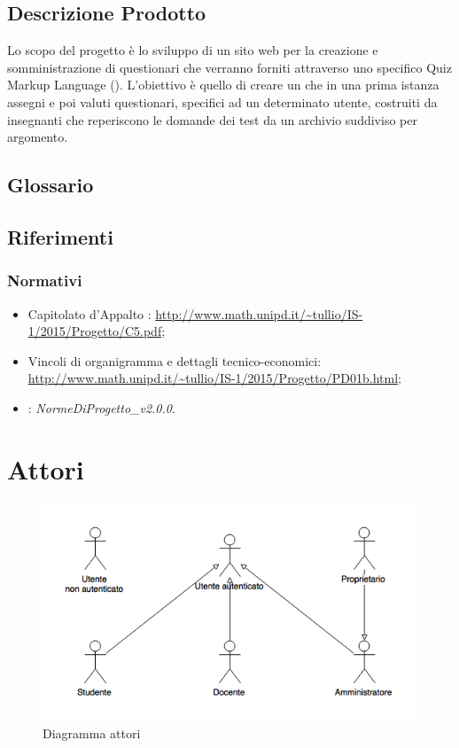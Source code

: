 \documentclass[12pt,a4paper]{article}
\begin{document}
\subsection{Descrizione Prodotto}
Lo scopo del progetto è lo sviluppo di un sito web per la creazione e somministrazione di questionari che verranno forniti attraverso uno specifico Quiz Markup Language (). L'obiettivo è quello di creare un  che in una prima istanza assegni e poi valuti questionari, specifici ad un determinato utente, costruiti da insegnanti che reperiscono le domande dei test da un archivio suddiviso per argomento.

\subsection{Glossario}
\glossarioPrint

\subsection{Riferimenti}
\subsubsection{Normativi}
\begin{itemize}
	\item Capitolato d’Appalto \prjL: \url{http://www.math.unipd.it/~tullio/IS-1/2015/Progetto/C5.pdf};
	\item Vincoli di organigramma e dettagli tecnico-economici: \url{http://www.math.unipd.it/~tullio/IS-1/2015/Progetto/PD01b.html};
	\item \NdP: \textit{NormeDiProgetto_v2.0.0}. 
\end{itemize}

\newpage
\section{Attori}

\begin{figure}[H]
    \includegraphics[width=\textwidth]{../img/diagramUCActors.png}
    \caption{Diagramma attori}
\end{figure}
\end{document}
